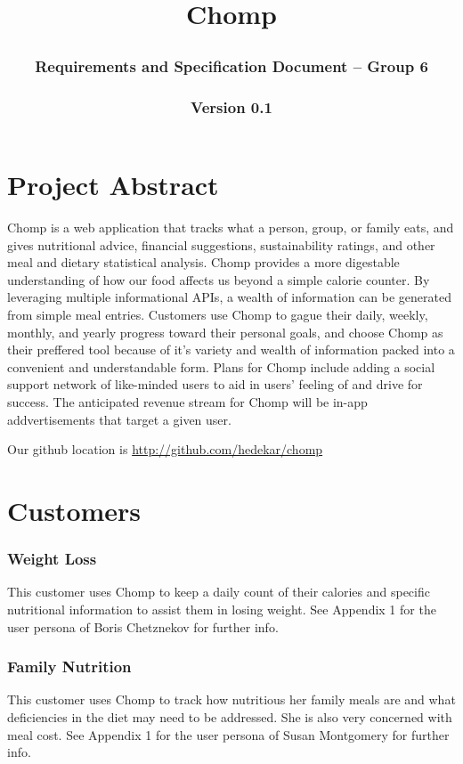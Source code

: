\documentclass[a4paper,12pt]{article}
\begin{document}
\title{Chomp
\subsubsection*{Requirements and Specification Document -- Group 6}\subsubsection*{Version 0.1}
}\maketitle
\section*{Project Abstract}
Chomp is a web application that tracks what a person, group, or family eats, and gives nutritional advice, financial suggestions, sustainability ratings, and other meal and dietary statistical analysis.  Chomp provides a more digestable understanding of how our food affects us beyond a simple calorie counter.  By leveraging multiple informational APIs, a wealth of information can be generated from simple meal entries.  Customers use Chomp to gague their daily, weekly, monthly, and yearly progress toward their personal goals, and choose Chomp as their preffered tool because of it's variety and wealth of information packed into a convenient and understandable form.  Plans for Chomp include adding a social support network of like-minded users to aid in users' feeling of and drive for success.  The anticipated revenue stream for Chomp will be in-app addvertisements that target a given user.

Our github location is \url{http://github.com/hedekar/chomp}
\section*{Customers}
\subsubsection*{Weight Loss}
This customer uses Chomp to keep a daily count of their calories and specific nutritional information to assist them in losing weight.  See Appendix 1 for the user persona of Boris Chetznekov for further info.
\subsubsection*{Family Nutrition}
This customer uses Chomp to track how nutritious her family meals are and what deficiencies in the diet may need to be addressed.  She is also very concerned with meal cost.  See Appendix 1 for the user persona of Susan Montgomery for further info.
\end{document}
